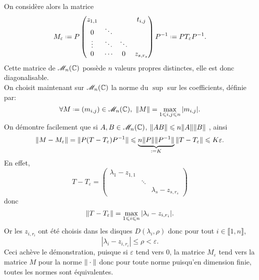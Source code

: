 \begin{preuve}
    On considère alors la matrice
    $$M_\varepsilon \defeq P 
    \begin{pmatrix}
        z_{1, 1} & & & t_{i,j} \\
        0 & \ddots & & \\
        \vdots & \ddots & \ddots & \\
        0 & \cdots & 0 & z_{s, r_s}
    \end{pmatrix}
    \Inv{P} \defeq P T_\varepsilon \Inv{P}.
    $$
    Cette matrice de $\mathscr{M}_n(\mathbb{C})$ possède $n$ valeurs propres distinctes, elle est donc diagonalisable. \\
    On choisit maintenant sur $\mathscr{M}_n(\mathbb{C})$ la norme du $\sup$ sur les coefficients, définie par:
    $$\forall M \defeq (m_{i,j}) \in \M_n(\C),\ \norme{M} = \max_{1 \leqslant i, j \leqslant n} |m_{i,j}|.$$
    On démontre facilement que si $A, B \in \mathscr{M}_n(\mathbb{C})$, $\Vert AB \Vert \leqslant n \Vert A \Vert \Vert B \Vert$ \note, ainsi
    $$\norme{M - M_\varepsilon} = \norme{P (T - T_\varepsilon) \Inv{P}} \leqslant \underbrace{n \norme{P} \norme{P^{-1}}}_{\defeq K} \norme{T - T_\varepsilon} \leqslant K \varepsilon.$$
    En effet, 
    $$
    T - T_\varepsilon = 
    \begin{pmatrix}
    \lambda_1 - z_{1, 1} &  & \\
    & \ddots & \\
    & & \lambda_s - z_{s, r_s}
    \end{pmatrix}
    $$
    donc
    $$\Vert T - T_\varepsilon \Vert = \max_{1 \leqslant i \leqslant n} |\lambda_i - z_{i, r_i}|.$$
    Or les $z_{i, r_i}$ ont été choisis dans les disques $D(\lambda_i, \rho)$ donc pour tout $i \in \llbracket 1, n \rrbracket$,
    $$|\lambda_i - z_{i, r_i}| \leqslant \rho < \varepsilon.$$
    Ceci achève le démonstration, puisque si $\varepsilon$ tend vers $0$, la matrice $M_\varepsilon$ tend vers la matrice $M$ pour la norme $\Vert \cdot \Vert$ donc pour toute norme puisqu'en dimension finie, toutes les normes sont équivalentes.
\end{preuve}

